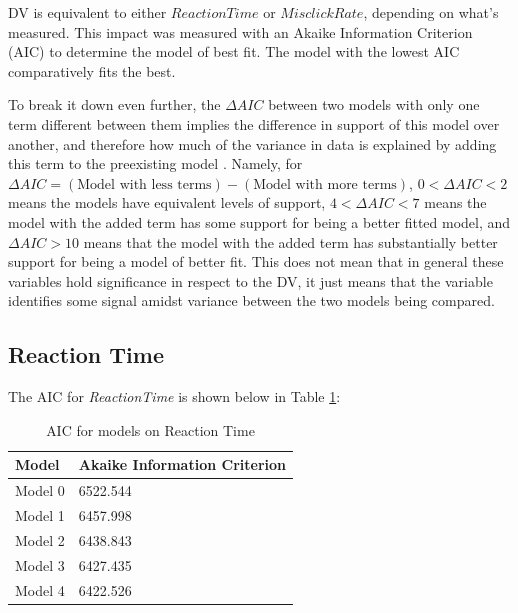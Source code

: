 \documentclass[12pt,twoside]{reedthesis}
\begin{document}
    DV is equivalent to either $ReactionTime$ or $MisclickRate$, depending on what's measured. This impact was measured with an Akaike Information Criterion (AIC) to determine the model of best fit. The model with the lowest AIC comparatively fits the best.

    To break it down even further, the $\Delta AIC$ between two models with only one term different between them implies the difference in support of this model over another, and therefore how much of the variance in data is explained by adding this term to the preexisting model \cite{burnham_information_2002}. Namely, for $\Delta AIC=(\text{Model with less terms}) - (\text{Model with more terms})$, $0<\Delta AIC < 2$ means the models have equivalent levels of support, $4<\Delta AIC <7$ means the model with the added term has some support for being a better fitted model, and $\Delta AIC >10$ means that the model with the added term has substantially better support for being a model of better fit. This does not mean that in general these variables hold significance in respect to the DV, it just means that the variable identifies some signal amidst variance between the two models being compared.

    \subsection{Reaction Time}\label{4.2.1}

    The AIC for \textit{ReactionTime} is shown below in Table \ref{aic_speed}:

    \begin{table}[H]
        \centering
        \begin{tabular}{| p{3.5cm} | p{7.5cm} |}
            \hline
            Model & Akaike Information Criterion\\
            \hline
            Model 0 & 6522.544\\
            \hline
            Model 1 & 6457.998\\
            \hline
            Model 2 & 6438.843\\
            \hline
            Model 3 & 6427.435\\
            \hline
            Model 4 & 6422.526\\
            \hline
        \end{tabular}
        \caption{AIC for models on Reaction Time}
        \label{aic_speed}
    \end{table}
\end{document}
